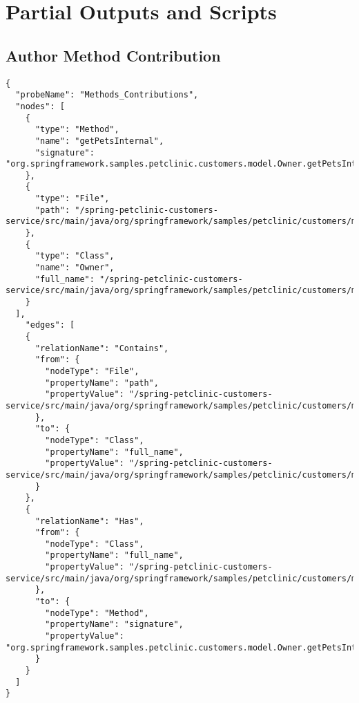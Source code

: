 \chapter{Partial Outputs and Scripts}\label{appendix_a}

\section{Author Method Contribution}\label{appendix_sec:author_method_contributions}
\begin{lstlisting}
{
  "probeName": "Methods_Contributions",
  "nodes": [
    {
      "type": "Method",
      "name": "getPetsInternal",
      "signature": "org.springframework.samples.petclinic.customers.model.Owner.getPetsInternal()"
    },
    {
      "type": "File",
      "path": "/spring-petclinic-customers-service/src/main/java/org/springframework/samples/petclinic/customers/model/Owner.java"
    },
    {
      "type": "Class",
      "name": "Owner",
      "full_name": "/spring-petclinic-customers-service/src/main/java/org/springframework/samples/petclinic/customers/model/Owner.java:Owner"
    }
  ],
    "edges": [
    {
      "relationName": "Contains",
      "from": {
        "nodeType": "File",
        "propertyName": "path",
        "propertyValue": "/spring-petclinic-customers-service/src/main/java/org/springframework/samples/petclinic/customers/model/Owner.java"
      },
      "to": {
        "nodeType": "Class",
        "propertyName": "full_name",
        "propertyValue": "/spring-petclinic-customers-service/src/main/java/org/springframework/samples/petclinic/customers/model/Owner.java:Owner"
      }
    },
    {
      "relationName": "Has",
      "from": {
        "nodeType": "Class",
        "propertyName": "full_name",
        "propertyValue": "/spring-petclinic-customers-service/src/main/java/org/springframework/samples/petclinic/customers/model/Owner.java:Owner"
      },
      "to": {
        "nodeType": "Method",
        "propertyName": "signature",
        "propertyValue": "org.springframework.samples.petclinic.customers.model.Owner.getPetsInternal()"
      }
    }
  ]
}
\end{lstlisting}

